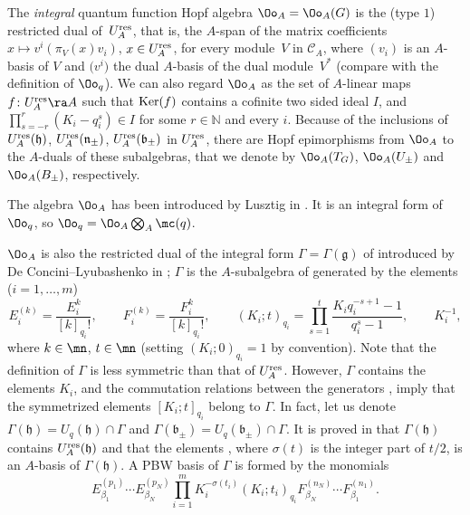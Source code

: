 The {\it integral} quantum function Hopf algebra $\Oo_A=\Oo_A(G)$ is the (type $1$) restricted dual of~$U_A^{\rm res}$, that is, the $A$-span of the matrix coefficients $x\mapsto v^i(\pi_V(x)v_i)$, $x\in U_A^{\rm res}$, for every module~$V$ in $\mathcal{C}_A$, where $(v_i)$ is an $A$-basis of $V$ and $\big(v^i\big)$ the dual $A$-basis of the dual module~$V^*$ (compare with the definition of $\Oo_q$). We can also regard $\Oo_A$ as the set of $A$-linear maps~${f\colon U_A^{\rm res}\ra A}$ such that ${\rm Ker}(f)$ contains a cofinite two sided ideal $I$, and $ \prod_{s=-r}^r (K_i - q_i^s) \in I$ for some $r\in \mathbb{N}$ and every $i$. Because of the inclusions of $U_A^{\rm res}(\mathfrak{h})$, $U_A^{\rm res}(\mathfrak{n}_\pm)$, $U_A^{\rm res}(\mathfrak{b}_\pm)$ in $U_A^{\rm res}$, there are Hopf epimorphisms from $\Oo_A$ to the $A$-duals of these subalgebras, that we denote by $\Oo_A(T_G)$, $\Oo_A(U_\pm)$ and $\Oo_A(B_\pm)$, respectively.

The algebra $\Oo_A$ has been introduced by Lusztig in \cite{Lusztig2,Lusztig}. It is an integral form of $\Oo_q$, so $\Oo_q = \Oo_A \bigotimes_A \mc(q)$.

$\Oo_A$ is also the restricted dual of the integral form $\Gamma=\Gamma(\mathfrak{g})$ of  introduced by De Concini--Lyubashenko in \cite[Sections 2 and~3]{DC-L}; $\Gamma$ is the $A$-subalgebra of  generated by the elements ($i=1,\dots,m$)
\[E_i^{(k)}= \frac{E_i^k}{[k]_{q_i}!} ,\qquad F_i^{(k)}= \frac{F_i^k}{[k]_{q_i}!} ,\qquad ( K_i; t )_{q_i}= \prod_{s=1}^t \frac{K_iq_i^{-s+1}-1}{q_i^s-1},\qquad K_i^{-1},\]
where $k\in \mn$, $t\in \mn$ (setting $( K_i; 0)_{q_i}=1$ by convention). Note that the definition of $\Gamma$ is less symmetric than that of $U_A^{\rm res}$. However, $\Gamma$ contains the elements $K_i$, and the commutation relations between the generators ,  imply that the symmetrized elements $[ K_i; t ]_{q_i}$ belong to $\Gamma$. In fact, let us denote $\Gamma(\mathfrak{h}) = U_q(\mathfrak{h}) \cap \Gamma$ and $\Gamma(\mathfrak{b}_\pm) = U_q(\mathfrak{b}_\pm) \cap \Gamma$. It is proved in \cite[Theorem 3.1]{DC-L} that $\Gamma(\mathfrak{h})$ contains $U_A^{\rm res}(\mathfrak{h})$ and that the elements , where $\sigma(t)$ is the integer part of $t/2$, is an $A$-basis of $\Gamma(\mathfrak{h})$. A PBW basis of $\Gamma$ is formed by the monomials
\[%
E_{\beta_1}^{(p_1)}\cdots E_{\beta_N}^{(p_N)}\prod_{i=1}^m K_i^{-\sigma(t_i)}(K_i; t_i)_{q_i} F_{\beta_N}^{(n_N)}\cdots F_{\beta_1}^{(n_1)}.
\]

